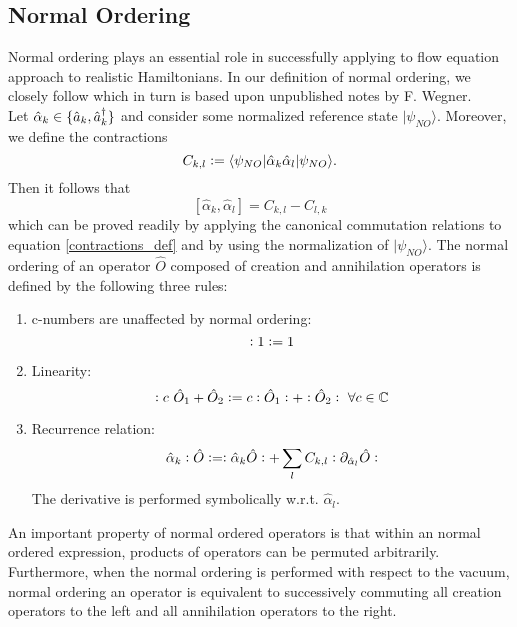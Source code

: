\subsection{Normal Ordering}
Normal ordering plays an essential role in successfully applying to flow equation approach to realistic Hamiltonians. In our definition of normal ordering, we closely follow \cite[pp. 62-63]{kehrein2006flow} which in turn is based upon unpublished notes by F. Wegner.\\
Let $\hat\alpha_k\in\{\hat a_k,\hat a^\dagger_k\}$ and consider some normalized reference state $|\psi_{NO}\rangle$. Moreover, we define the contractions 
\begin{equation}\label{contractions_def}
C_{k,l}\vcentcolon= \langle \psi_{NO}|\hat\alpha_k\hat\alpha_l|\psi_{NO}\rangle.
\end{equation}
Then it follows that
\begin{equation}
\left[\hat\alpha_k,\hat\alpha_l\right] = C_{k,l}-C_{l,k}
\end{equation}
which can be proved readily by applying the canonical commutation relations to equation \ref{contractions_def} and by using the normalization of $|\psi_{NO}\rangle$.
The normal ordering of an operator $\hat O$ composed of creation and annihilation operators is defined by the following three rules:
\begin{enumerate}
\item c-numbers are unaffected by normal ordering:
\begin{equation}
\vcentcolon 1\vcentcolon = 1
\end{equation}
\item Linearity:
\begin{equation}
\vcentcolon c\ \hat O_1+\hat O_2\vcentcolon = c \vcentcolon \hat O_1\vcentcolon+\vcentcolon \hat O_2\vcentcolon\ \forall c\in\mathbb{C}
\end{equation}
\item Recurrence relation:
\begin{equation}\label{recurrence relation}
\hat\alpha_k\vcentcolon\hat O\vcentcolon=\vcentcolon\hat\alpha_k\hat O\vcentcolon + \sum\limits_l C_{k,l}\vcentcolon{\partial_{\hat\alpha_l}\hat O}\vcentcolon 
\end{equation}
The derivative is performed symbolically w.r.t. $\hat\alpha_l$.
\end{enumerate}
An important property of normal ordered operators is that within an normal ordered expression, products of operators can be permuted arbitrarily.\\
Furthermore, when the normal ordering is performed with respect to the vacuum, normal ordering an operator is equivalent to successively commuting all creation operators to the left and all annihilation operators to the right. 
